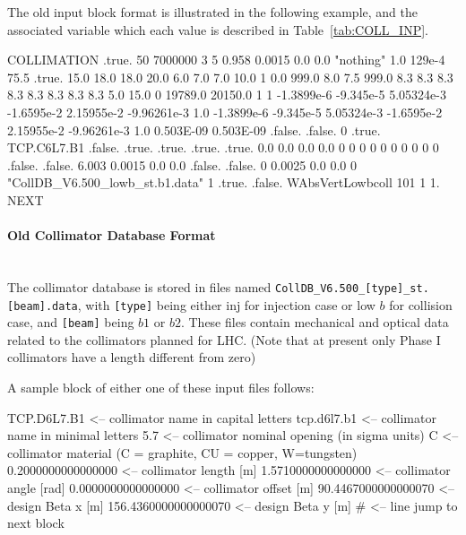The old input block format is illustrated in the following example, and the associated variable which each value is described in Table~\ref{tab:COLL_INP}.

\bigskip
\begin{cverbatim}
COLLIMATION
   .true.
   50   7000000
   3  5  0.958  0.0015  0.0  0.0  "nothing"  1.0 129e-4  75.5
   .true.  15.0  18.0  18.0  20.0  6.0  7.0  7.0  10.0 1 0.0  999.0  8.0   7.5   999.0
   8.3  8.3  8.3  8.3  8.3  8.3  8.3  8.3  5.0 15.0
   0 19789.0  20150.0  1  1
  -1.3899e-6  -9.345e-5  5.05324e-3  -1.6595e-2  2.15955e-2  -9.96261e-3  1.0
  -1.3899e-6  -9.345e-5  5.05324e-3  -1.6595e-2  2.15955e-2  -9.96261e-3  1.0
   0.503E-09  0.503E-09
  .false. .false. 0 .true. TCP.C6L7.B1 .false. .true. .true. .true. .true.
   0.0 0.0 0.0 0.0
   0   0   0   0   0   0   0   0   0   0   .false.
  .false.  6.003  0.0015
   0.0 0.0 .false. .false.
   0   0.0025  0.0   0.0   0
   "CollDB_V6.500_lowb_st.b1.data"  1
   .true. .false. WAbsVertLowbcoll  101  1  1.
NEXT
\end{cverbatim}

\paragraph{Old Collimator Database Format}~\\

The collimator database is stored in files named \texttt{CollDB\_V6.500\_[type]\_st.[beam].data}, with \texttt{[type]} being either inj for injection case or low $b$ for collision case, and \texttt{[beam]} being $b1$ or $b2$.
These files contain mechanical and optical data related to the collimators planned for LHC. (Note that at present only Phase I collimators have a length different from zero)

A sample block of either one of these input files follows:

\begin{cverbatim}
TCP.D6L7.B1             <-- collimator name in capital letters
tcp.d6l7.b1             <-- collimator name in minimal letters
5.7                     <-- collimator nominal opening (in sigma units)
C                       <-- collimator material (C = graphite, CU = copper, W=tungsten)
  0.2000000000000000    <-- collimator length [m]
  1.5710000000000000    <-- collimator angle [rad]
  0.0000000000000000    <-- collimator offset [m]
 90.4467000000000070    <-- design Beta x [m]
156.4360000000000070    <-- design Beta y [m]
#                       <-- line jump to next block
\end{cverbatim}

